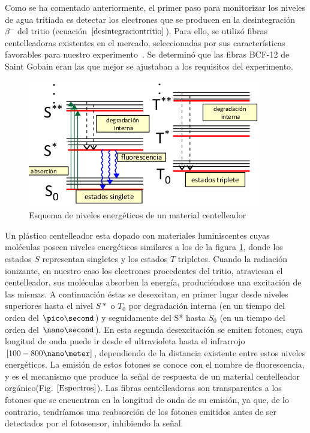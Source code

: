 Como se ha comentado anteriormente, el primer paso para monitorizar los niveles de agua tritiada es detectar los electrones que se producen en la desintegración $\beta^-$ del tritio (ecuación  $\eqref{desintegraciontritio}$). Para ello, se utilizó  fibras centelleadoras existentes en el mercado, seleccionadas por sus características favorables para nuestro experimento~\cite{Alberto}.  Se determinó que las fibras BCF-12 de Saint Gobain eran las que mejor se ajustaban a los requisitos del experimento. 


\begin{figure}[hbtp]
\centering
\includegraphics[scale=0.7]{EsquemaNivelesFIbras.png}
\caption{Esquema de niveles energéticos de un material centelleador~\cite{asignatura}\label{Esquemafibras}
}
\end{figure}


Un plástico centelleador esta dopado con  materiales luminiscentes cuyas moléculas poseen  niveles energéticos similares a los de la figura \ref{Esquemafibras},
donde los estados $S$ representan singletes y los estados $T$ tripletes. Cuando la radiación ionizante, en nuestro caso los electrones procedentes del tritio,  atraviesan el centelleador, sus moléculas absorben la energía, produciéndose una excitación de las mismas. 
A continuación éstas se desexcitan, en primer lugar desde niveles superiores hasta el nivel $S*$ o $T_0$ por degradación interna (en un tiempo del orden del $\pico\second$) y seguidamente del S* hasta $S_0$ (en un tiempo del orden del $\nano\second$). En esta segunda desexcitación se emiten fotones, cuya longitud de onda puede ir desde el ultravioleta hasta el infrarrojo $[100-800 \nano\meter]$, dependiendo de la distancia existente entre estos niveles energéticos. La emisión de estos fotones se conoce con el nombre de  fluorescencia, y es el mecanismo que produce la señal de respuesta de un material centelleador orgánico(Fig. $\ref{Espectros}$).
Las fibras centelleadoras son transparentes a los fotones que se encuentran en la longitud de onda de su emisión, ya que, de lo contrario, tendríamos una reabsorción de los fotones emitidos antes de ser detectados por el fotosensor, inhibiendo la señal.

